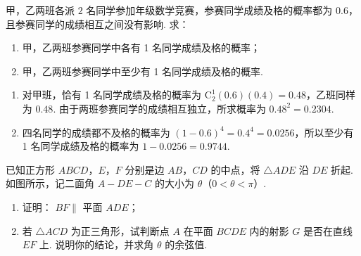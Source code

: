 \begin{problem}
甲，乙两班各派 \(2\) 名同学参加年级数学竞赛，参赛同学成绩及格的概率都为 \(0.6\)，且参赛同学的成绩相互之间没有影响. 求：

\begin{enumerate}
\item 甲，乙两班参赛同学中各有 1 名同学成绩及格的概率；
\item 甲，乙两班参赛同学中至少有 1 名同学成绩及格的概率.
\end{enumerate}
\end{problem}

\begin{solution}
\begin{enumerate}
\item 对甲班，恰有 1 名同学成绩及格的概率为 \(\mathrm C_2^1(0.6)(0.4)=0.48\)，乙班同样为 \(0.48\). 由于两班参赛同学的成绩相互独立，所求概率为 \(0.48^2=0.2304\).
\item 四名同学的成绩都不及格的概率为 \((1-0.6)^4=0.4^4=0.0256\)，所以至少有 1 名同学成绩及格的概率为 \(1-0.0256=0.9744\).
\end{enumerate}
\end{solution}

\begin{problem}
已知正方形 \(ABCD\)，\(E\)，\(F\) 分别是边 \(AB\)，\(CD\) 的中点，将 \(\triangle ADE\) 沿 \(DE\) 折起. 如图所示，记二面角 \(A - DE - C\) 的大小为 \(\theta\)（\(0 < \theta < \pi\)）.

\begin{enumerate}
\item 证明： \(BF \parallel\) 平面 \(ADE\)；
\item 若 \(\triangle ACD\) 为正三角形，试判断点 \(A\) 在平面 \(BCDE\) 内的射影 \(G\) 是否在直线 \(EF\) 上. 说明你的结论，并求角 \(\theta\) 的余弦值.
\end{enumerate}

\FloatBarrier
\end{problem}

